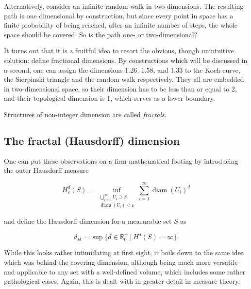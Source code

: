 \documentclass[twocolumn,10pt]{scrartcl}
\begin{document}
            Alternatively, consider an infinite random walk in two dimensions. The resulting path is one dimensional by
            construction, but since every point in space has a finite probability of being reached, after an infinite
            number of steps, the whole space should be covered. So is the path one- or two-dimensional?

            It turns out that it is a fruitful idea to resort the obvious, though unintuitive solution: define
            fractional dimensions. By constructions which will be discussed in a second, one can assign the dimensions
            1.26, 1.58, and 1.33 to the Koch curve, the Sierpinski triangle and the
            random walk respectively. They all are embedded in two-dimensional space, so their dimension has to be
            less than or equal to 2, and their topological dimension is 1, which serves as a lower boundary.

            Structures of non-integer dimension are called \emph{fractals}.

        \subsection{The fractal (Hausdorff) dimension}
            One can put these observations on a firm mathematical footing by introducing the outer Hausdorff measure

            \begin{equation*}
                H^d_\varepsilon(S)=
                \inf_{\substack{\bigcup_{i=1}^\infty U_i\supset S\\ \operatorname{diam}(U_i) <
                \varepsilon}}
                    \sum_{i=1}^\infty \operatorname{diam}(U_i)^d
            \end{equation*}

            and define the Hausdorff dimension for a measurable set $S$ as

            \begin{equation*}
                d_H = \sup\{d\in\mathbb{R}^+_0\ |\ H^d(S) = \infty\}.
            \end{equation*}

            While this looks rather intimidating at first sight, it boils down to the same idea which was behind the
            covering dimension, although being much more versatile and applicable to any set with a well-defined
            volume, which includes some rather pathological cases. Again, this is dealt with in greater detail in
            measure theory.
\end{document}
